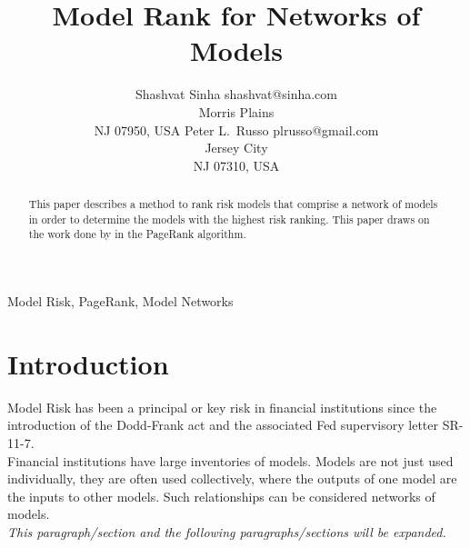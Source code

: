 \documentclass[twoside,11pt]{article}
\begin{document}
\title{Model Rank for Networks of Models}

\author{\name Shashvat Sinha \email shashvat@sinha.com \\
       \addr Morris Plains\\
       NJ 07950, USA
       \AND
       \name Peter L.\ Russo \email plrusso@gmail.com \\
       \addr Jersey City\\
       NJ 07310, USA}


\maketitle

\begin{abstract}%
This paper describes a method to rank risk models that comprise a network of models in order to determine the models with the highest risk ranking. This paper draws on the work done by \citet{brin_page} in the PageRank algorithm. 
\end{abstract}

\begin{keywords}
  Model Risk, PageRank, Model Networks
\end{keywords}

\section{Introduction}

Model Risk has been a principal or key risk in financial institutions since the introduction of the Dodd-Frank act and the associated Fed supervisory letter SR-11-7.\\

Financial institutions have large inventories of models. Models are not just used individually, they are often used collectively, where the outputs of one model are the inputs to other models. Such relationships can be considered networks of models.\\

{\noindent \em This paragraph/section and the following paragraphs/sections will be expanded.}


\end{document}
